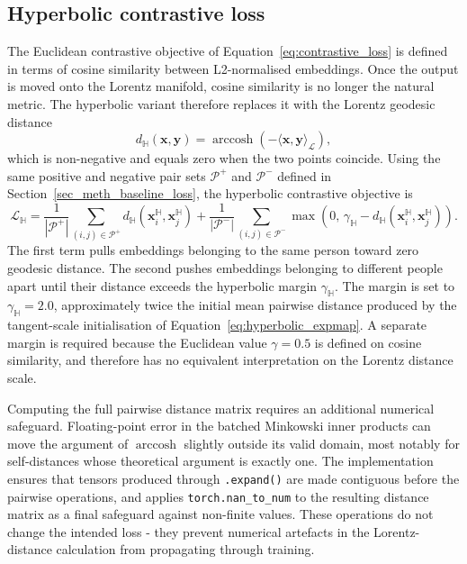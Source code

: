 \subsection{Hyperbolic contrastive loss}
\label{sec_meth_hyperbolic_loss}

The Euclidean contrastive objective of
Equation~\eqref{eq:contrastive_loss} is defined in terms of cosine
similarity between L2-normalised embeddings.
Once the output is moved onto the Lorentz manifold,
cosine similarity is no longer the natural metric.
The hyperbolic variant therefore replaces it with the Lorentz
geodesic distance
\begin{equation}
    d_{\mathbb{H}}(\mathbf{x},\mathbf{y})
    =
    \operatorname{arccosh}
    \left(
        -\langle\mathbf{x},\mathbf{y}\rangle_{\mathcal{L}}
    \right),
    \label{eq:hyperbolic_distance}
\end{equation}
which is non-negative and equals zero when the two points coincide.
Using the same positive and negative pair sets
$\mathcal{P}^{+}$ and $\mathcal{P}^{-}$ defined in
Section~\ref{sec_meth_baseline_loss},
the hyperbolic contrastive objective is
\begin{equation}
    \mathcal{L}_{\mathbb{H}}
    =
    \frac{1}{|\mathcal{P}^{+}|}
    \sum_{(i,j)\in\mathcal{P}^{+}}
    d_{\mathbb{H}}
    \left(
        \mathbf{x}^{\mathbb{H}}_i,
        \mathbf{x}^{\mathbb{H}}_j
    \right)
    +
    \frac{1}{|\mathcal{P}^{-}|}
    \sum_{(i,j)\in\mathcal{P}^{-}}
    \max\!\left(
        0,\,
        \gamma_{\mathbb{H}}
        -
        d_{\mathbb{H}}
        \left(
            \mathbf{x}^{\mathbb{H}}_i,
            \mathbf{x}^{\mathbb{H}}_j
        \right)
    \right).
    \label{eq:hyperbolic_contrastive}
\end{equation}
The first term pulls embeddings belonging to the same person toward
zero geodesic distance.
The second pushes embeddings belonging to different people apart
until their distance exceeds the hyperbolic margin $\gamma_{\mathbb{H}}$.
The margin is set to $\gamma_{\mathbb{H}}=2.0$,
approximately twice the initial mean pairwise distance
produced by the tangent-scale initialisation of
Equation~\eqref{eq:hyperbolic_expmap}.
A separate margin is required because the Euclidean value $\gamma=0.5$
is defined on cosine similarity,
and therefore has no equivalent interpretation
on the Lorentz distance scale.

Computing the full pairwise distance matrix requires an additional
numerical safeguard.
Floating-point error in the batched Minkowski inner products
can move the argument of $\operatorname{arccosh}$
slightly outside its valid domain,
most notably for self-distances whose theoretical argument is exactly one.
The implementation ensures that tensors produced through
\texttt{.expand()} are made contiguous before the pairwise operations,
and applies \texttt{torch.nan\_to\_num} to the resulting distance
matrix as a final safeguard against non-finite values.
These operations do not change the intended loss -
they prevent numerical artefacts in the Lorentz-distance calculation
from propagating through training.

